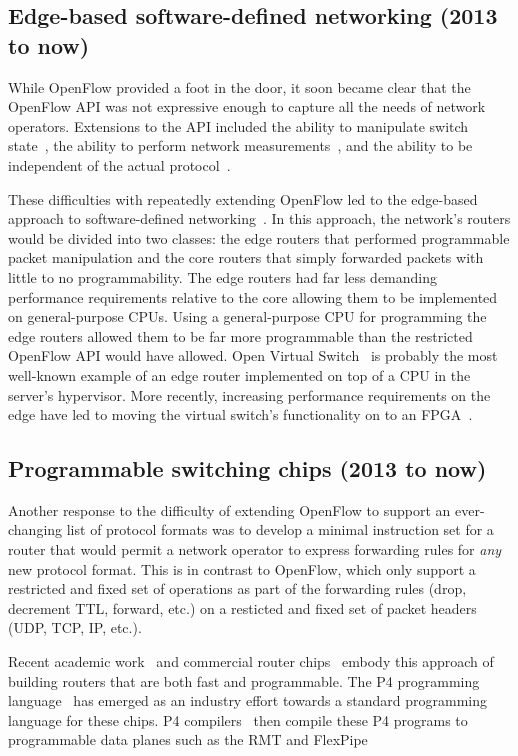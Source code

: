 \subsection{Edge-based software-defined networking (2013 to now)}
While OpenFlow provided a foot in the door, it soon became clear that the
OpenFlow API was not expressive enough to capture all the needs of network
operators. Extensions to the API included the ability to manipulate switch
state~\cite{fast}, the ability to perform network
measurements~\cite{opensketch}, and the ability to be independent of the actual
protocol~\cite{pof}.

These difficulties with repeatedly extending OpenFlow led to the edge-based
approach to software-defined networking~\cite{fabric, nsx, openvswitch}. In
this approach, the network's routers would be divided into two classes: the
edge routers that performed programmable packet manipulation and the core
routers that simply forwarded packets with little to no programmability. The
edge routers had far less demanding performance requirements relative to the
core allowing them to be implemented on general-purpose CPUs. Using a
general-purpose CPU for programming the edge routers allowed them to be far
more programmable than the restricted OpenFlow API would have allowed. Open
Virtual Switch~\cite{ovs} is probably the most well-known example of an edge
router implemented on top of a CPU in the server's hypervisor. More recently,
increasing performance requirements on the edge have led to moving the virtual
switch's functionality on to an FPGA~\cite{daniel_firestone_nsdi}. 


\subsection{Programmable switching chips (2013 to now)}
Another response to the difficulty of extending OpenFlow to support an
ever-changing list of protocol formats was to develop a minimal instruction set
for a router that would permit a network operator to express forwarding rules
for {\em any} new protocol format. This is in contrast to OpenFlow, which only
support a restricted and fixed set of operations as part of the forwarding
rules (drop, decrement TTL, forward, etc.) on a resticted and fixed set of
packet headers (UDP, TCP, IP, etc.).

Recent academic work~\cite{rmt} and commercial router chips~\cite{tofino,
flexpipe, xpliant} embody this approach of building routers that are
both fast and programmable. The P4 programming language~\cite{p4} has emerged
as an industry effort towards a standard programming language for these chips.
P4 compilers~\cite{lavanya_compiler, p4c} then compile these P4 programs to
programmable data planes such as the RMT and FlexPipe~\cite{flexpipe}

